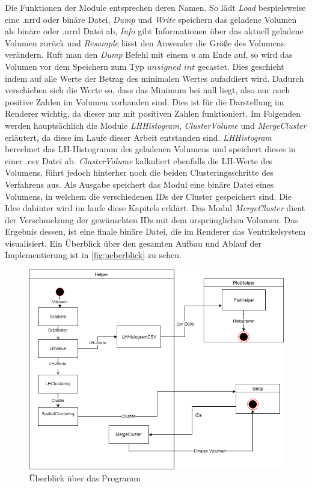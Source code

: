 \newline
Die Funktionen der Module entsprechen deren Namen. So lädt \textit{Load} bespielsweise eine .nrrd oder binäre Datei, \textit{Dump} und \textit{Write} speichern das geladene Volumen als binäre oder .nrrd Datei ab, \textit{Info} gibt Informationen über das aktuell geladene Volumen zurück und \textit{Resample} lässt den Anwender die Größe des Volumens verändern. Ruft man den \textit{Dump} Befehl mit einem $u$ am Ende auf, so wird das Volumen vor dem Speichern zum Typ $unsigned$ $int$ gecastet. Dies geschieht indem auf alle Werte der Betrag des minimalen Wertes aufaddiert wird. Dadurch verschieben sich die Werte so, dass das Minimum bei null liegt, also nur noch positive Zahlen im Volumen vorhanden sind. Dies ist für die Darstellung im Renderer wichtig, da dieser nur mit positiven Zahlen funktioniert.
\newline
Im Folgenden werden hauptsächlich die Module \textit{LHHistogram}, \textit{ClusterVolume} und \textit{MergeCluster} erläutert, da diese im Laufe dieser Arbeit entstanden sind. \textit{LHHistogram} berechnet das LH-Histogramm des geladenen Volumens und speichert dieses in einer .csv Datei ab. \textit{ClusterVolume} kalkuliert ebenfalls die LH-Werte des Volumens, führt jedoch hinterher noch die beiden Clusteringsschritte des Verfahrens aus. Als Ausgabe speichert das Modul eine binäre Datei eines Volumens, in welchem die verschiedenen IDs der Cluster gespeichert sind. Die Idee dahinter wird im laufe diese Kapitels erklärt. Das Modul \textit{MergeCluster} dient der Verschmelzung der gewünschten IDs mit dem ursprünglichen Volumen. Das Ergebnis dessen, ist eine finale binäre Datei, die im Renderer das Ventrikelsystem visualisiert. Ein Überblick über den gesamten Aufbau und Ablauf der Implementierung ist in  \autoref{fig:ueberblick} zu sehen.

\begin{figure}
\centering 
\includegraphics[width=\textwidth]{Logos/Ueberblick.png}
\caption{Überblick über das Programm} 
\label{fig:ueberblick} 
\end{figure}


